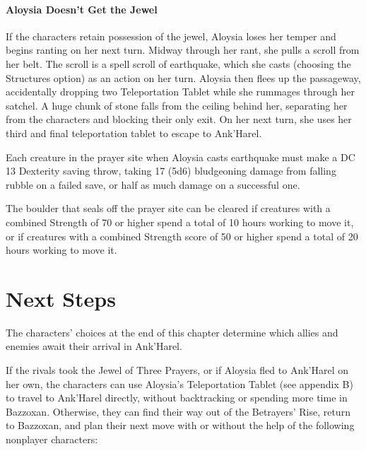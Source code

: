 \documentclass[10pt,a4paper,twoside,bg=print,twocolumn,openany,nodeprecatedcode]{dndbook}
\begin{document}
\paragraph{Aloysia Doesn't Get the Jewel}
If the characters retain possession of the jewel, Aloysia loses her temper and begins ranting on her next turn. Midway through her rant, she pulls a scroll from her belt. The scroll is a spell scroll of earthquake, which she casts (choosing the Structures option) as an action on her turn. Aloysia then flees up the passageway, accidentally dropping two Teleportation Tablet while she rummages through her satchel. A huge chunk of stone falls from the ceiling behind her, separating her from the characters and blocking their only exit. On her next turn, she uses her third and final teleportation tablet to escape to Ank'Harel.

Each creature in the prayer site when Aloysia casts earthquake must make a DC 13 Dexterity saving throw, taking 17 (5d6) bludgeoning damage from falling rubble on a failed save, or half as much damage on a successful one.

The boulder that seals off the prayer site can be cleared if creatures with a combined Strength of 70 or higher spend a total of 10 hours working to move it, or if creatures with a combined Strength score of 50 or higher spend a total of 20 hours working to move it.

\section{Next Steps}
The characters' choices at the end of this chapter determine which allies and enemies await their arrival in Ank'Harel.

If the rivals took the Jewel of Three Prayers, or if Aloysia fled to Ank'Harel on her own, the characters can use Aloysia's Teleportation Tablet (see appendix B) to travel to Ank'Harel directly, without backtracking or spending more time in Bazzoxan. Otherwise, they can find their way out of the Betrayers' Rise, return to Bazzoxan, and plan their next move with or without the help of the following nonplayer characters:
\end{document}
